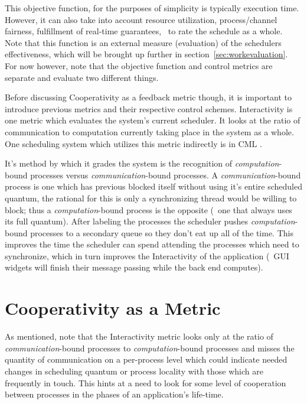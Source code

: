 This objective function, for the purposes of simplicity is typically execution time. However, it can also take into
account resource utilization, process/channel fairness, fulfillment of real-time guarantees, \etc~to rate the 
schedule as a whole. Note that this function is an external measure (evaluation) of the schedulers effectiveness,
which will be brought up further in section~\ref{sec:workevaluation}. For now however, note that the objective 
function and control metrics are separate and evaluate two different things.

Before discussing Cooperativity as a feedback metric though, it is important to introduce previous metrics and their
respective control schemes. Interactivity is one metric which evaluates the system's current scheduler. It looks at 
the ratio of communication to computation currently taking place in the system as a whole. One scheduling system which 
utilizes this metric indirectly is in CML \cite{reppy1993concurrent}.

It's method by which it grades the system is the recognition of {\em computation}-bound processes versus
{\em communication}-bound processes. A {\em communication}-bound process is one which has previous blocked itself
without using it's entire scheduled quantum, the rational for this is only a synchronizing thread would be willing
to block; thus a {\em computation}-bound process is the opposite (\ie~one that always uses its full quantum). After
labeling the processes the scheduler pushes {\em computation}-bound processes to a secondary queue so they don't eat
up all of the time. This improves the time the scheduler can spend attending the processes which need to synchronize,
which in turn improves the Interactivity of the application (\ie~GUI widgets will finish their message passing while 
the back end computes).

\section{Cooperativity as a Metric}


As mentioned, note that the Interactivity metric looks only at the ratio of {\em communication}-bound processes to {\em computation}-bound
processes and misses the quantity of communication on a per-process level which could indicate needed changes in
scheduling quantum or process locality with those which are frequently in touch. 
This hints at a need to look for some level of cooperation between processes in the phases of an application's
life-time. 

